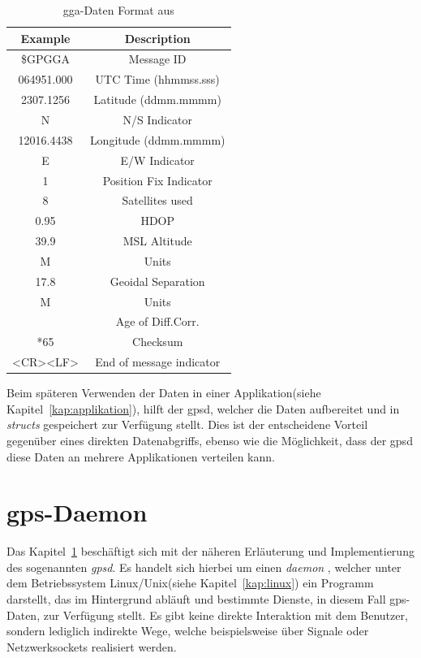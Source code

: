 \begin{table}[h]
\centering
\begin{tabular}{c|c}
\toprule
\textbf{Example} & \textbf{Description}   \\
\midrule
\centering
\$GPGGA & Message ID \\
\hline
064951.000 & UTC Time (hhmmss.sss) \\
\hline
2307.1256 & Latitude (ddmm.mmmm) \\
\hline
N & N/S Indicator  \\
\hline
12016.4438 & Longitude (ddmm.mmmm) \\
\hline
E & E/W Indicator  \\
\hline
1 & Position Fix Indicator  \\
\hline
8 & Satellites used \\
\hline
0.95 & HDOP  \\
\hline
39.9 & MSL Altitude\\
\hline
M & Units  \\
\hline
17.8 & Geoidal Separation  \\
\hline
M & Units  \\
\hline
& Age of Diff.Corr.  \\
\hline
*65 & Checksum \\
\hline
<CR><LF> & End of message indicator  \\
\bottomrule
\end{tabular}
\caption{\ac{gga}-Daten Format aus \cite{pmodgps}}
\label{tab:gga}
\end{table}



Beim späteren Verwenden der Daten in einer Applikation(siehe Kapitel~\ref{kap:applikation}), hilft der \ac{gpsd},
welcher die Daten aufbereitet und in \emph{structs} gespeichert zur Verfügung stellt. Dies ist der entscheidene
Vorteil gegenüber eines direkten Datenabgriffs, ebenso wie die Möglichkeit, dass der \ac{gpsd} diese Daten
an mehrere Applikationen verteilen kann.\\

\section{\ac{gps}-Daemon}\label{kap:gpsd}

Das Kapitel~\ref{kap:gpsd} beschäftigt sich mit der näheren Erläuterung und
Implementierung des sogenannten \emph{\ac{gpsd}}. Es handelt sich hierbei um einen \emph{\ac{daemon}} ,
welcher unter dem Betriebssystem Linux/Unix(siehe Kapitel~\ref{kap:linux}) ein Programm darstellt,
das im Hintergrund abläuft und bestimmte Dienste, in diesem Fall \ac{gps}-Daten, zur Verfügung stellt.
Es gibt keine direkte Interaktion mit dem Benutzer, sondern lediglich indirekte Wege, welche beispielsweise über
 Signale oder Netzwerksockets realisiert werden. \cite{daemon}\\

